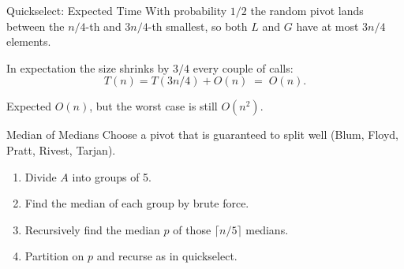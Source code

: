 \documentclass[10pt,aspectratio=169]{beamer}
\begin{document}
\begin{frame}{Quickselect: Expected Time}
  With probability $1/2$ the random pivot lands between the $n/4$-th and $3n/4$-th smallest,
  so both $L$ and $G$ have at most $3n/4$ elements.

  \bigskip
  \begin{center}
  \end{center}

  \bigskip
  In expectation the size shrinks by $3/4$ every couple of calls:
  \[
    T(n) = T(3n/4) + O(n) \;=\; O(n).
  \]

  \bigskip
  \begin{center}
    \small Expected $O(n)$, but the worst case is still $O(n^2)$.
  \end{center}
\end{frame}

\begin{frame}{Median of Medians}
  Choose a pivot that is \alert{guaranteed} to split well (Blum, Floyd, Pratt, Rivest, Tarjan).

  \bigskip
  \begin{enumerate}
    \item \alert{Divide} $A$ into groups of 5.
    \item \alert{Find the median} of each group by brute force.
    \item \alert{Recursively} find the median $p$ of those $\lceil n/5 \rceil$ medians.
    \item \alert{Partition} on $p$ and recurse as in quickselect.
  \end{enumerate}
\end{frame}
\end{document}
